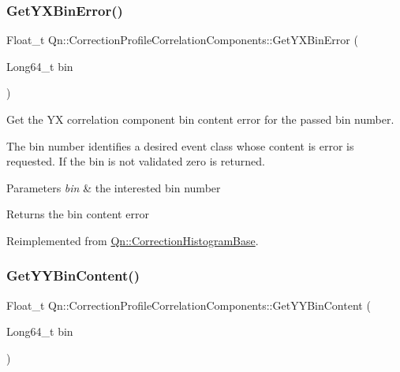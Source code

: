 \subsubsection{\texorpdfstring{Get\+Y\+X\+Bin\+Error()}{GetYXBinError()}}
{\footnotesize\ttfamily Float\+\_\+t Qn\+::\+Correction\+Profile\+Correlation\+Components\+::\+Get\+Y\+X\+Bin\+Error (\begin{DoxyParamCaption}\item[{Long64\+\_\+t}]{bin }\end{DoxyParamCaption})\hspace{0.3cm}{\ttfamily [virtual]}}

Get the YX correlation component bin content error for the passed bin number.

The bin number identifies a desired event class whose content is error is requested. If the bin is not validated zero is returned.


\begin{DoxyParams}{Parameters}
{\em bin} & the interested bin number \\
\hline
\end{DoxyParams}
\begin{DoxyReturn}{Returns}
the bin content error 
\end{DoxyReturn}


Reimplemented from \mbox{\hyperlink{classQn_1_1CorrectionHistogramBase_a07055fbf2b7df0ee3912fd68c18572c0}{Qn\+::\+Correction\+Histogram\+Base}}.

\mbox{\label{classQn_1_1CorrectionProfileCorrelationComponents_a6af717d8880002afe43b294f1a152546}} 
\subsubsection{\texorpdfstring{Get\+Y\+Y\+Bin\+Content()}{GetYYBinContent()}}
{\footnotesize\ttfamily Float\+\_\+t Qn\+::\+Correction\+Profile\+Correlation\+Components\+::\+Get\+Y\+Y\+Bin\+Content (\begin{DoxyParamCaption}\item[{Long64\+\_\+t}]{bin }\end{DoxyParamCaption})\hspace{0.3cm}{\ttfamily [virtual]}}

